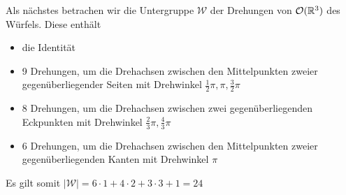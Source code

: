 Als nächstes betrachen wir die Untergruppe $\mathcal{W}$ der Drehungen von ${\mathcal{O}(\mathbb{R}^3)}$ des Würfels. Diese enthält
\begin{itemize} 
  \item die Identität
  \item 9 Drehungen, um die Drehachsen zwischen den Mittelpunkten zweier gegenüberliegender Seiten mit Drehwinkel $\frac{1}{2}\pi,\pi,\frac{3}{2}\pi$
  \item 8 Drehungen, um die Drehachsen zwischen zwei gegenüberliegenden Eckpunkten mit Drehwinkel $\frac{2}{3}\pi,\frac{4}{3}\pi$
  \item 6 Drehungen, um die Drehachsen zwischen den Mittelpunkten zweier gegenüberliegenden Kanten mit Drehwinkel $\pi$
\end{itemize}
Es gilt somit $|\mathcal{W}|=6 \cdot 1 + 4 \cdot 2 + 3 \cdot 3 +1 = 24$

